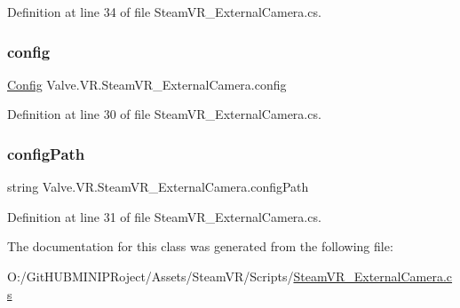 Definition at line 34 of file Steam\+V\+R\+\_\+\+External\+Camera.\+cs.

\mbox{\label{class_valve_1_1_v_r_1_1_steam_v_r___external_camera_a62a9d8567c47f62e620191b404abc47f}} 
\subsubsection{\texorpdfstring{config}{config}}
{\footnotesize\ttfamily \mbox{\hyperlink{struct_valve_1_1_v_r_1_1_steam_v_r___external_camera_1_1_config}{Config}} Valve.\+V\+R.\+Steam\+V\+R\+\_\+\+External\+Camera.\+config}



Definition at line 30 of file Steam\+V\+R\+\_\+\+External\+Camera.\+cs.

\mbox{\label{class_valve_1_1_v_r_1_1_steam_v_r___external_camera_a9d7064ad5953dceb33901e1e03140b2a}} 
\subsubsection{\texorpdfstring{configPath}{configPath}}
{\footnotesize\ttfamily string Valve.\+V\+R.\+Steam\+V\+R\+\_\+\+External\+Camera.\+config\+Path}



Definition at line 31 of file Steam\+V\+R\+\_\+\+External\+Camera.\+cs.



The documentation for this class was generated from the following file\+:\begin{DoxyCompactItemize}
\item 
O\+:/\+Git\+H\+U\+B\+M\+I\+N\+I\+P\+Roject/\+Assets/\+Steam\+V\+R/\+Scripts/\mbox{\hyperlink{_steam_v_r___external_camera_8cs}{Steam\+V\+R\+\_\+\+External\+Camera.\+cs}}\end{DoxyCompactItemize}
